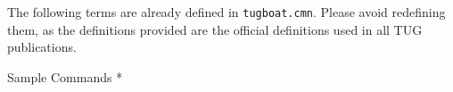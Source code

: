 \medskip
\noindent
The following terms are already defined in {\tt tugboat.cmn}.   Please
avoid redefining them, as the definitions provided are the official
definitions used in all TUG publications.

\medskip


\newpage
\head * Sample Commands *

\everyverbatim{\enablemetacode}

